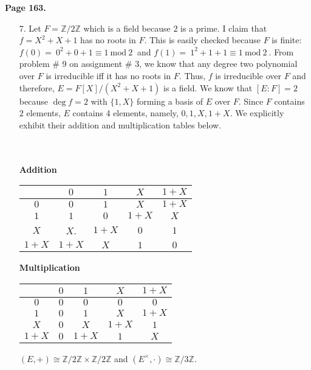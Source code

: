\documentclass[12pt]{extarticle}
\newcommand{\Z}{\mathbb{Z}}
\renewcommand{\mod}[3]{\: #1 \equiv #2 \: \mathrm{mod} \: #3 \:}
\begin{document}
\textbf{Page 163.} 
\begin{enumerate}
\item[7.] Let $F = \Z/2\Z$ which is a field because $2$ is a prime. I claim that $f = X^2 + X + 1$ has no roots in $F$. This is easily checked because $F$ is finite: $f(0) = \mod{0^2 + 0 + 1}{1}{2}$ and $f(1) = \mod{1^2 + 1 + 1}{1}{2}$. From problem \# 9 on assignment \# 3, we know that any degree two polynomial over $F$ is irreducible iff it has no roots in $F$. Thus, $f$ is irreducible over $F$ and therefore, $E = F[X]/(X^2 + X + 1)$ is a field. We know that $[E : F] = 2$ because $\deg{f} = 2$ with $\{1, X\}$ forming a basis of $E$ over $F$. Since $F$ contains $2$ elements, $E$ contains 4 elements, namely, $0, 1, X, 1 + X$. We explicitly exhibit their addition and multiplication tables below. \\ \\ \\
\begin{center}
\textbf{Addition} \\
\begin{tabular}{ c | c c c c}
  & $0$ & $1$ & $X$ & $1 + X$ \\
\hline
 $0$ & $0$ & $1$ & $X$ & $1 + X$ \\ 
 $1$ & $1$ & $0$ & $1 + X$ & $X$ \\  
 $X$ & $X$. & $1 + X$ & $0$ & $1$ \\
 $1 + X$ & $1 + X$ & $X$ & $1$ & $0$ 
\end{tabular}
\end{center}

\begin{center}
\textbf{Multiplication} \\
\begin{tabular}{ c | c c c c}
  & $0$ & $1$ & $X$ & $1 + X$ \\
\hline
 $0$ & $0$ & $0$ & $0$ & $0$ \\ 
 $1$ & $0$ & $1$ & $X$ & $1 + X$ \\  
 $X$ & $0$ & $X$ & $1 + X$ & $1$ \\
 $1 + X$ & $0$ & $1 + X$ & $1$ & $X$ 
\end{tabular}
\end{center}
$(E, +) \cong \Z/2\Z \times \Z/2\Z$ and $(E^\times, \cdot) \cong \Z/3\Z$.


\end{enumerate}
\end{document}
